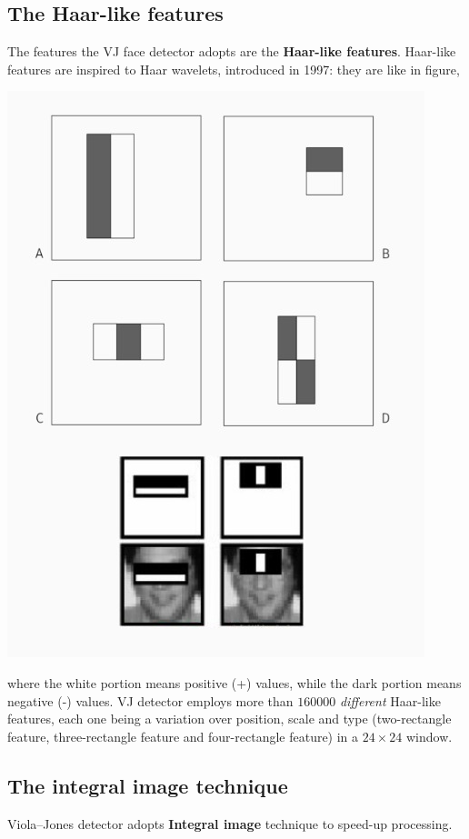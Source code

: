 \documentclass[10pt]{report}
\begin{document}
\subsection{The Haar-like features}
\label{sec:orgd2a004b}
The features the VJ face detector adopts are the \textbf{Haar\--like features}. Haar\--like features are inspired to Haar wavelets, introduced in 1997: they are like in figure,

\begin{center}
\includegraphics[width=.9\linewidth]{./pics/recog/haar-like.jpg}
\end{center}

where the white portion means positive (+) values, while the dark portion means negative (-) values. VJ detector employs more than \(160000\) \emph{different} Haar\--like features, each one being a variation over position, scale and type (two\--rectangle feature, three\--rectangle feature and four\--rectangle feature) in a \(24 \times 24\) window.
\subsection{The integral image technique}
\label{sec:org20928b9}
Viola\---Jones detector adopts \textbf{Integral image} technique to speed\--up processing.
\end{document}
